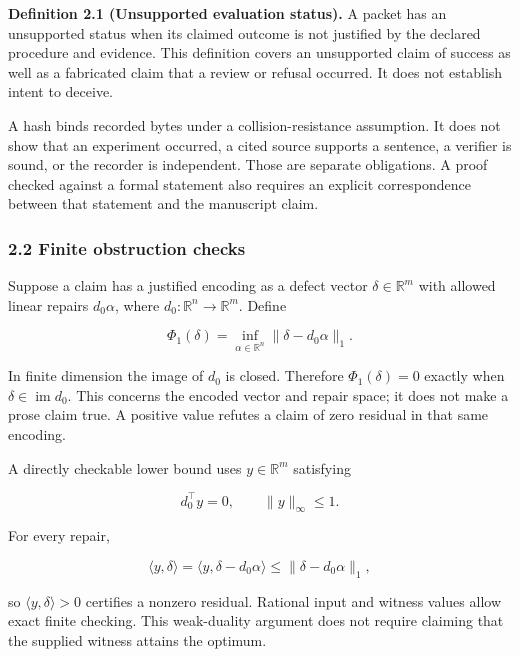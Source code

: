 \documentclass[
  10pt,
]{article}
\begin{document}
\textbf{Definition 2.1 (Unsupported evaluation status).} A packet has an unsupported status when its claimed outcome is not justified by the declared procedure and evidence. This definition covers an unsupported claim of success as well as a fabricated claim that a review or refusal occurred. It does not establish intent to deceive.

A hash binds recorded bytes under a collision-resistance assumption. It does not show that an experiment occurred, a cited source supports a sentence, a verifier is sound, or the recorder is independent. Those are separate obligations. A proof checked against a formal statement also requires an explicit correspondence between that statement and the manuscript claim.

\subsubsection{2.2 Finite obstruction checks}\label{finite-obstruction-checks}

Suppose a claim has a justified encoding as a defect vector \hypertarget{math-E0009-0009}{}{\(\delta\in\mathbb R^m\)} with allowed linear repairs \hypertarget{math-E0010-0010}{}{\(d_0\alpha\)}, where \hypertarget{math-E0011-0011}{}{\(d_0:\mathbb R^n\to\mathbb R^m\)}. Define

\hypertarget{math-E0012-0012}{}{\[\Phi_1(\delta)=\inf_{\alpha\in\mathbb R^n}\|\delta-d_0\alpha\|_1.\]}

In finite dimension the image of \hypertarget{math-E0013-0013}{}{\(d_0\)} is closed. Therefore \hypertarget{math-E0014-0014}{}{\(\Phi_1(\delta)=0\)} exactly when \hypertarget{math-E0015-0015}{}{\(\delta\in\operatorname{im}d_0\)}. This concerns the encoded vector and repair space; it does not make a prose claim true. A positive value refutes a claim of zero residual in that same encoding.

A directly checkable lower bound uses \hypertarget{math-E0016-0016}{}{\(y\in\mathbb R^m\)} satisfying

\hypertarget{math-E0017-0017}{}{\[d_0^\top y=0,\qquad \|y\|_\infty\le1.\]}

For every repair,

\hypertarget{math-E0018-0018}{}{\[\langle y,\delta\rangle=\langle y,\delta-d_0\alpha\rangle
\le\|\delta-d_0\alpha\|_1,\]}

so \hypertarget{math-E0019-0019}{}{\(\langle y,\delta\rangle>0\)} certifies a nonzero residual. Rational input and witness values allow exact finite checking. This weak-duality argument does not require claiming that the supplied witness attains the optimum.
\end{document}
